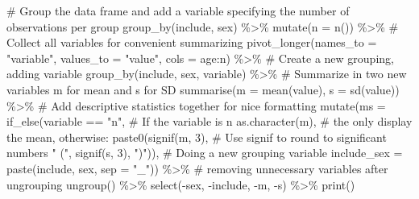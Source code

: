 \documentclass[
  11pt,
  letterpaper,
]{scrbook}
\newenvironment{Shaded}{\begin{snugshade}}{\end{snugshade}}
\newcommand{\AttributeTok}[1]{\textcolor[rgb]{0.40,0.45,0.13}{#1}}
\newcommand{\CommentTok}[1]{\textcolor[rgb]{0.37,0.37,0.37}{#1}}
\newcommand{\DecValTok}[1]{\textcolor[rgb]{0.68,0.00,0.00}{#1}}
\newcommand{\FunctionTok}[1]{\textcolor[rgb]{0.28,0.35,0.67}{#1}}
\newcommand{\NormalTok}[1]{\textcolor[rgb]{0.00,0.23,0.31}{#1}}
\newcommand{\SpecialCharTok}[1]{\textcolor[rgb]{0.37,0.37,0.37}{#1}}
\newcommand{\StringTok}[1]{\textcolor[rgb]{0.13,0.47,0.30}{#1}}
\begin{document}
\begin{Shaded}
\begin{Highlighting}[numbers=left,,]
  \CommentTok{\# Group the data frame and add a variable specifying the number of observations per group}
  \FunctionTok{group\_by}\NormalTok{(include, sex) }\SpecialCharTok{\%\textgreater{}\%}
  \FunctionTok{mutate}\NormalTok{(}\AttributeTok{n =} \FunctionTok{n}\NormalTok{()) }\SpecialCharTok{\%\textgreater{}\%}
  \CommentTok{\# Collect all variables for convenient summarizing}
  \FunctionTok{pivot\_longer}\NormalTok{(}\AttributeTok{names\_to =} \StringTok{"variable"}\NormalTok{, }
               \AttributeTok{values\_to =} \StringTok{"value"}\NormalTok{, }
               \AttributeTok{cols =}\NormalTok{ age}\SpecialCharTok{:}\NormalTok{n) }\SpecialCharTok{\%\textgreater{}\%}
  \CommentTok{\# Create a new grouping, adding variable}
  \FunctionTok{group\_by}\NormalTok{(include, sex, variable) }\SpecialCharTok{\%\textgreater{}\%}
  \CommentTok{\# Summarize in two new variables m for mean and s for SD}
  \FunctionTok{summarise}\NormalTok{(}\AttributeTok{m =} \FunctionTok{mean}\NormalTok{(value), }
            \AttributeTok{s =} \FunctionTok{sd}\NormalTok{(value)) }\SpecialCharTok{\%\textgreater{}\%}
  \CommentTok{\# Add descriptive statistics together for nice formatting}
  \FunctionTok{mutate}\NormalTok{(}\AttributeTok{ms =} \FunctionTok{if\_else}\NormalTok{(variable }\SpecialCharTok{==} \StringTok{"n"}\NormalTok{, }\CommentTok{\# If the variable is n}
                      \FunctionTok{as.character}\NormalTok{(m), }\CommentTok{\# the only display the mean, otherwise:}
                        \FunctionTok{paste0}\NormalTok{(}\FunctionTok{signif}\NormalTok{(m, }\DecValTok{3}\NormalTok{), }\CommentTok{\# Use signif to round to significant numbers}
                        \StringTok{" ("}\NormalTok{,}
                        \FunctionTok{signif}\NormalTok{(s, }\DecValTok{3}\NormalTok{), }
                        \StringTok{")"}\NormalTok{)), }
         \CommentTok{\# Doing a new grouping variable}
         \AttributeTok{include\_sex =} \FunctionTok{paste}\NormalTok{(include, sex, }\AttributeTok{sep =} \StringTok{"\_"}\NormalTok{)) }\SpecialCharTok{\%\textgreater{}\%}
  \CommentTok{\# removing unnecessary variables after ungrouping}
  \FunctionTok{ungroup}\NormalTok{() }\SpecialCharTok{\%\textgreater{}\%}
  \FunctionTok{select}\NormalTok{(}\SpecialCharTok{{-}}\NormalTok{sex, }\SpecialCharTok{{-}}\NormalTok{include, }\SpecialCharTok{{-}}\NormalTok{m, }\SpecialCharTok{{-}}\NormalTok{s) }\SpecialCharTok{\%\textgreater{}\%}
  \FunctionTok{print}\NormalTok{()}
\end{Highlighting}
\end{Shaded}
\end{document}
